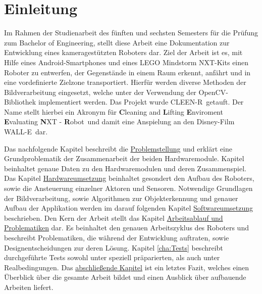 \chapter{Einleitung}
\label{cha:einleitung}

Im Rahmen der Studienarbeit des fünften und sechsten Semesters für die Prüfung zum Bachelor of Engineering, stellt diese Arbeit eine Dokumentation zur Entwicklung eines kameragestützten Roboters dar. Ziel der Arbeit ist es, mit Hilfe eines Android-Smartphones und eines LEGO Mindstorm NXT-Kits einen Roboter zu entwerfen, der Gegenstände in einem Raum erkennt, anfährt und in eine vordefinierte Zielzone transportiert. Hierfür werden diverse Methoden der Bildverarbeitung eingesetzt, welche unter der Verwendung der OpenCV-Bibliothek \cite{opencv_library} implementiert werden. Das Projekt wurde \glqq CLEEN-R\grqq\ getauft. Der Name stellt hierbei ein Akronym für \glqq \textbf{C}leaning and \textbf{L}ifting \textbf{E}nviroment \textbf{E}valuating \textbf{N}XT - \textbf{R}obot\grqq\ und damit eine Anspielung an den Disney-Film \glqq WALL-E\grqq\ dar.

Das nachfolgende Kapitel beschreibt die \hyperref[cha:Problemstellung]{Problemstellung} und erklärt eine Grundproblematik der Zusammenarbeit der beiden Hardwaremodule. Kapitel  beinhaltet genaue Daten zu den Hardwaremodulen und deren Zusammenspiel. Das Kapitel \hyperref[cha:robot]{Hardwareumsetzung} beinhaltet gesondert den Aufbau des Roboters, sowie die Ansteuerung einzelner Aktoren und Sensoren. Notwendige Grundlagen der Bildverarbeitung, sowie Algorithmen zur Objekterkennung und genauer Aufbau der Applikation werden im darauf folgenden Kapitel \hyperref[cha:Software]{Softwareumsetzung} beschrieben. Den Kern der Arbeit stellt das Kapitel \hyperref[cha:Workloop]{Arbeitsablauf und Problematiken} dar. Es beinhaltet den genauen Arbeitszyklus des Roboters und beschreibt Problematiken, die während der Entwicklung auftraten, sowie Designentscheidungen zur deren Lösung. Kapitel \ref{cha:Tests} beschreibt durchgeführte Tests sowohl unter speziell präparierten, als auch unter Realbedingungen. Das \hyperref[cha:Fazit]{abschließende Kapitel} ist ein letztes Fazit, welches einen Überblick über die gesamte Arbeit bildet und einen Ausblick über aufbauende Arbeiten liefert.




